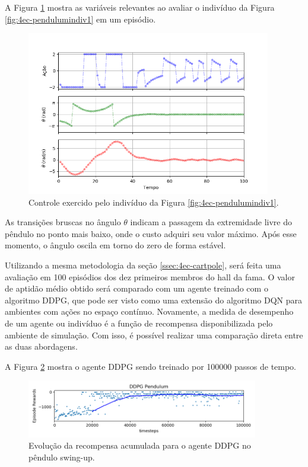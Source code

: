 A Figura \ref{fig:4ec-pendulumgraficosaval} mostra as variáveis relevantes ao avaliar o indivíduo da Figura \ref{fig:4ec-pendulumindiv1} em um episódio. 

\begin{figure}[H]
	\centering
	\includegraphics[width=0.95\textwidth]{02_desenvolvimento/04_EC_Fig_PendulumGraficosAval.png}
	\caption{Controle exercido pelo indivíduo da Figura \ref{fig:4ec-pendulumindiv1}.}
	\label{fig:4ec-pendulumgraficosaval}
\end{figure}

As transições bruscas no ângulo $\theta$ indicam a passagem da extremidade livre do pêndulo no ponto mais baixo, onde o custo adquiri seu valor máximo. Após esse momento, o ângulo oscila em torno do zero de forma estável.

Utilizando a mesma metodologia da seção \ref{ssec:4ec-cartpole}, será feita uma avaliação em 100 episódios dos dez primeiros membros do hall da fama. O valor de aptidão médio obtido será comparado com um agente treinado com o algoritmo DDPG, que pode ser visto como uma extensão do algoritmo DQN para ambientes com ações no espaço contínuo. Novamente, a medida de desempenho de um agente ou indivíduo é a função de recompensa disponibilizada pelo ambiente de simulação. Com isso, é possível realizar uma comparação direta entre as duas abordagens.

A Figura \ref{fig:4ec-pendulumddpggraf} mostra o agente DDPG sendo treinado por 100000 passos de tempo.

\begin{figure}[H]
	\centering
	\includegraphics[width=0.9\textwidth]{02_desenvolvimento/04_EC_Fig_PendulumDDPGGraf.png}
	\caption{Evolução da recompensa acumulada para o agente DDPG no pêndulo swing-up.}
	\label{fig:4ec-pendulumddpggraf}
\end{figure}

